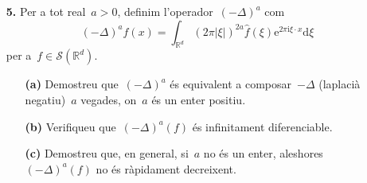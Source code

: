 \documentclass[a4paper]{article}
\theoremstyle{plain}
\theoremstyle{definition}
\newcommand{\iu}{\mathrm{i}}
\newcommand{\e}{\mathrm{e}}
\providecommand{\uppi}{\pi}
\newcommand{\diff}{\mathrm{d}}
\newcommand{\abs}[1]{\lvert{#1}\rvert}
\newcommand{\Sc}{\mathcal{S}}
\newcommand{\mlap}{-\Delta}
\newcommand{\RR}{\mathbb{R}}
\begin{document}
\begin{enumerate}
    \item[\textbf{5.}] Per a tot real~\(a>0\), definim
        l'operador~\((\mlap)^{a}\) com
        \[
            (\mlap)^{a}f(x)
            =
            \int_{\RR^{d}}
            (2\uppi\abs{\xi})^{2a}
            \widehat{f}(\xi)
            \e^{2\uppi\iu\xi\cdot x}
            \diff\xi
        \]
        per a~\(f\in\Sc(\RR^{d})\).
        \begin{enumerate}
            \item[\textbf{(a)}] Demostreu que~\((\mlap)^{a}\) és equivalent a
                composar~\(\mlap\) (laplacià negatiu)~\(a\) vegades, on~\(a\)
                és un enter positiu.
        \end{enumerate}
\end{enumerate}

\begin{enumerate}
    \item[]\begin{enumerate}
        \item[\textbf{(b)}] Verifiqueu que~\((\mlap)^{a}(f)\) és infinitament
            diferenciable.
    \end{enumerate}
\end{enumerate}

\begin{enumerate}
    \item[]\begin{enumerate}
        \item[\textbf{(c)}] Demostreu que, en general, si~\(a\) no és un enter,
            aleshores~\((\mlap)^{a}(f)\) no és ràpidament decreixent.
    \end{enumerate}
\end{enumerate}
\end{document}
